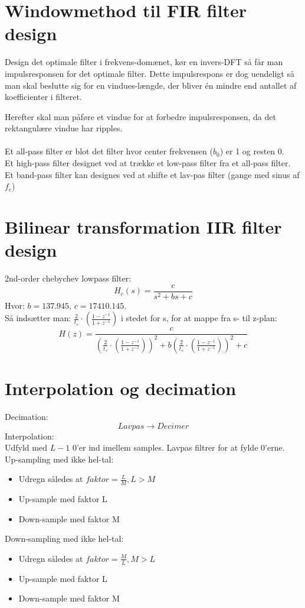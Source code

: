 \documentclass{article}
\begin{document}
\section{Windowmethod til FIR filter design}
Design det optimale filter i frekvens-domænet, kør en invers-DFT så får man impulsresponsen for det optimale filter. Dette impulsrespons er dog uendeligt så man skal beslutte sig for en vindues-længde, der bliver én mindre end antallet af koefficienter i filteret.

Herefter skal man påføre et vindue for at forbedre impulsresponsen, da det rektangulære vindue har ripples.
\\
\\
Et all-pass filter er blot det filter hvor center frekvensen ($b_0$) er 1 og resten 0.
\\
Et high-pass filter designet ved at trække et low-pass filter fra et all-pass filter.
\\
Et band-pass filter kan designes ved at shifte et lav-pas filter (gange med sinus af $f_c$)

\section{Bilinear transformation IIR filter design}
2nd-order chebychev lowpass filter:
$$H_c(s)=\frac{c}{s^2+bs+c}$$
Hvor: $b=137.945$, $c=17410.145$.\\
Så indsætter man: $\frac{2}{t_s}\cdot\left(\frac{1-z^{-1}}{1+z^{-1}}\right)$ i stedet for s, for at mappe fra s- til z-plan:
$$H(z)=\frac{c}{\left(\frac{2}{t_s}\cdot\left(\frac{1-z^{-1}}{1+z^{-1}}\right)\right)^2 + b\left(\frac{2}{t_s}\cdot\left(\frac{1-z^{-1}}{1+z^{-1}}\right)\right)^2+c}$$


\section{Interpolation og decimation}
Decimation:
$$Lavpas\rightarrow Decimer$$
Interpolation:\\
Udfyld med $L-1$ 0'er ind imellem samples. Lavpas filtrer for at fylde 0'erne.\\
Up-sampling med ikke hel-tal:
\begin{itemize}
\item Udregn således at $faktor = \frac{L}{M}, L>M$
\item Up-sample med faktor L
\item Down-sample med faktor M
\end{itemize}
Down-sampling med ikke hel-tal:
\begin{itemize}
\item Udregn således at $faktor = \frac{M}{L}, M>L$
\item Up-sample med faktor L
\item Down-sample med faktor M
\end{itemize}
\end{document}
